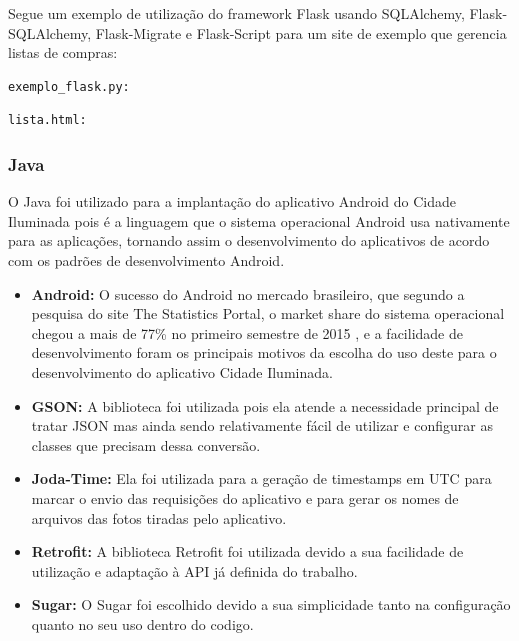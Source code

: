 \documentclass[
	article,			%
	11pt,				%
	oneside,			%
	a4paper,			%
	english,			%
	brazil,				%
	sumario=tradicional
	]{abntex2}
\begin{document}
Segue um exemplo de utilização do framework Flask usando SQLAlchemy, Flask-SQLAlchemy, Flask-Migrate e Flask-Script para um site de exemplo que gerencia listas de compras:

\begin{verbatim}
exemplo_flask.py:
\end{verbatim}



\begin{verbatim}
lista.html:
\end{verbatim}



\subsubsection{Java}

O Java foi utilizado para a implantação do aplicativo Android do Cidade Iluminada pois é a linguagem que o sistema operacional Android usa nativamente para as aplicações, tornando assim o desenvolvimento do aplicativos de acordo com os padrões de desenvolvimento Android.

\begin{itemize}
\item \textbf{Android:} O sucesso do Android no mercado brasileiro, que segundo a pesquisa do site The Statistics Portal, o market share do sistema operacional chegou a mais de 77\% no primeiro semestre de 2015 \cite{statista}, e a facilidade de desenvolvimento foram os principais motivos da escolha do uso deste para o desenvolvimento do aplicativo Cidade Iluminada.

\item \textbf{GSON:} A biblioteca foi utilizada pois ela atende a necessidade principal de tratar JSON mas ainda sendo relativamente fácil de utilizar e configurar as classes que precisam dessa conversão.

\item \textbf{Joda-Time:} Ela foi utilizada para a geração de timestamps em UTC para marcar o envio das requisições do aplicativo e para gerar os nomes de arquivos das fotos tiradas pelo aplicativo.

\item \textbf{Retrofit:} A biblioteca Retrofit foi utilizada devido a sua facilidade de utilização e adaptação à API já definida do trabalho.

\item \textbf{Sugar:} O Sugar foi escolhido devido a sua simplicidade tanto na configuração quanto no seu uso dentro do codigo.

\end{itemize}
\end{document}

